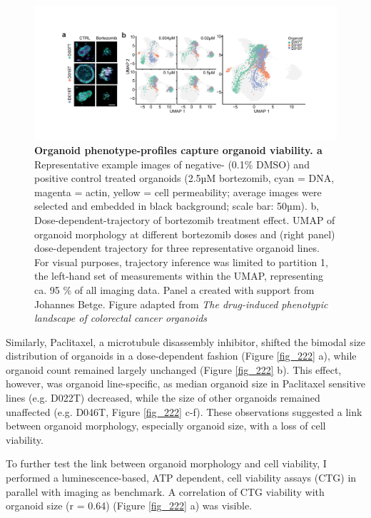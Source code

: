 \begin{flushleft}
\begin{figure}[h]
\centering
\includegraphics[width=\textwidth,
                height=\textheight,
                keepaspectratio]{figures/promise/pdf/fig_2_1.pdf}
\caption{\textbf{Organoid phenotype-profiles capture organoid viability. a} Representative example images of negative- (0.1\% DMSO) and positive control treated organoids (2.5µM bortezomib, cyan = DNA, magenta = actin, yellow = cell permeability; average images were selected and embedded in black background; scale bar: 50µm). b, Dose-dependent-trajectory of bortezomib treatment effect. UMAP of organoid morphology at different bortezomib doses and (right panel) dose-dependent trajectory for three representative organoid lines. For visual purposes, trajectory inference was limited to partition 1, the left-hand set of measurements within the UMAP, representing ca. 95 \% of all imaging data. Panel a created with support from Johannes Betge. Figure adapted from \textit{The drug-induced phenotypic landscape of colorectal cancer organoids} \cite{Betge2022-kr}}
\label{fig_221}
\end{figure}
\bigbreak

Similarly, Paclitaxel, a microtubule disassembly inhibitor, shifted the bimodal size distribution of organoids in a dose-dependent fashion (Figure \ref{fig_222} a), while organoid count remained largely unchanged (Figure \ref{fig_222} b). This effect, however, was organoid line-specific, as median organoid size in Paclitaxel sensitive lines (e.g. D022T) decreased, while the size of other organoids remained unaffected (e.g. D046T, Figure \ref{fig_222} c-f). These observations suggested a link between organoid morphology, especially organoid size, with a loss of cell viability. 

\bigbreak
To further test the link between organoid morphology and cell viability, I performed a luminescence-based, ATP dependent, cell viability assays (CTG) in parallel with imaging as benchmark. A correlation of CTG viability with organoid size (r = 0.64) (Figure \ref{fig_222} a) was visible. 


\end{flushleft}
